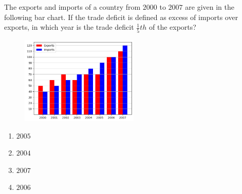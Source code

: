     \item The exports and imports  of a country from $2000$ to $2007$ are given in the following bar chart. If the trade deficit is defined as excess of imports over exports, in which year is the trade deficit $\frac{1}{5}th$ of the exports? 
\begin{figure}[H]
    \centering
	\includegraphics[width=0.5\textwidth]{GATE-yearwise/EE24BTECH11021/plots/plot.png}
    \label{fig:plot}
    \end{figure}
    \begin{enumerate}
        \item $2005$
        \item $2004$
        \item $2007$
        \item $2006$
    \end{enumerate}
    
